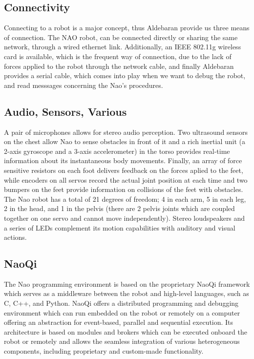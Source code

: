 \subsection{Connectivity}

Connecting to a robot is a major concept, thus Aldebaran provide us three means of connection. The NAO robot, can be connected directly or sharing the same network, through a wired ethernet link. Additionally, an IEEE 802.11g wireless card is available, which is the frequent way of connection, due to the lack of forces applied to the robot through the network cable, and finally Aldebaran provides a serial cable, which comes into play when we want to debug the robot, and read messsages concerning the Nao's procedures.


\subsection{Audio, Sensors, Various}

A pair of microphones allows for stereo audio perception. Two ultrasound sensors on the chest allow Nao to sense obstacles in front of it and a rich inertial unit (a 2-axis gyroscope and a 3-axis accelerometer) in the torso provides real-time information about its instantaneous body movements. Finally, an array of force sensitive resistors on each foot delivers feedback on the forces aplied to the feet, while encoders on all servos record the actual joint position at each time and two bumpers on the feet provide information on collisions of the feet with obstacles. The Nao robot has a total of 21 degrees of freedom; 4 in each arm, 5 in each leg, 2 in the head, and 1 in the pelvis (there are 2 pelvis joints which are coupled together on one servo and cannot move independently). Stereo loudspeakers and a series of LEDs complement its motion capabilities with auditory and visual actions.

\subsection{NaoQi}

The Nao programming environment is based on the proprietary NaoQi framework which serves as a middleware between the robot and high-level languages, such as C, C++, and Python. NaoQi offers a distributed programming and debugging environment which can run embedded on the robot or remotely on a computer offering an abstraction for event-based, parallel and sequential execution. Its architecture is based on modules and brokers which can be executed onboard the robot or remotely and allows the seamless integration of various heterogeneous components, including proprietary and custom-made functionality.

